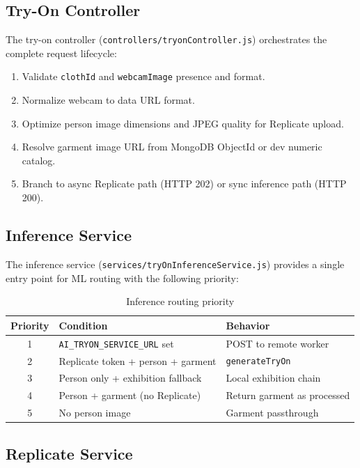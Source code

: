 \subsection{Try-On Controller}

The try-on controller (\texttt{controllers/tryonController.js}) orchestrates the complete request lifecycle:

\begin{enumerate}[leftmargin=*]
  \item Validate \texttt{clothId} and \texttt{webcamImage} presence and format.
  \item Normalize webcam to data URL format.
  \item Optimize person image dimensions and JPEG quality for Replicate upload.
  \item Resolve garment image URL from MongoDB ObjectId or dev numeric catalog.
  \item Branch to async Replicate path (HTTP 202) or sync inference path (HTTP 200).
\end{enumerate}

\subsection{Inference Service}

The inference service (\texttt{services/tryOnInferenceService.js}) provides a single entry point for ML routing with the following priority:

\begin{table}[H]
  \centering
  \caption{Inference routing priority}
  \label{tab:inference-priority}
  \begin{tabular}{@{}clp{8cm}@{}}
    \toprule
    \textbf{Priority} & \textbf{Condition} & \textbf{Behavior} \\
    \midrule
    1 & \texttt{AI\_TRYON\_SERVICE\_URL} set & POST to remote worker \\
    2 & Replicate token + person + garment & \texttt{generateTryOn} \\
    3 & Person only + exhibition fallback & Local exhibition chain \\
    4 & Person + garment (no Replicate) & Return garment as processed \\
    5 & No person image & Garment passthrough \\
    \bottomrule
  \end{tabular}
\end{table}

\subsection{Replicate Service}

